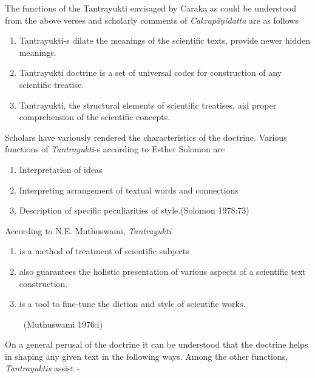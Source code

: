 The functions of the Tantrayukti envisaged by Caraka as could be understood from the above verses and scholarly comments of \textit{Cakrapāṇidatta} are as follows

\begin{enumerate}[{\rm a.}]
\itemsep=0pt
\item Tantrayukti-s dilate the meanings of the scientific texts, provide newer hidden meanings.

 \item Tantrayukti doctrine is a set of universal codes for construction of any scientific treatise.

 \item Tantrayukti, the structural elements of scientific treatises, aid proper comprehension of the scientific concepts.

\end{enumerate}

Scholars have variously rendered the characteristics of the doctrine. Various functions of \textit{Tantrayukti}-s according to Esther Solomon are

\begin{enumerate}[{\rm a.}]
\itemsep=0pt
\item Interpretation of ideas

 \item Interpreting arrangement of textual words and connections

 \item Description of specific peculiarities of style.\hfill (Solomon 1978:73)

\end{enumerate}

According to N.E. Muthuswami, \textit{Tantrayukti}

\begin{enumerate}[{\rm i)}]
\itemsep=0pt
\item is a method of treatment of scientific subjects

 \item also guarantees the holistic presentation of various aspects of a scientific text construction.

 \item is a tool to fine-tune the diction and style of scientific works.

~\hfill (Muthuswami 1976:i)

\end{enumerate}

On a general perusal of the doctrine it can be understood that the doctrine helps in shaping any given text in the following ways. Among the other functions, \textit{Tantrayuktis} assist -

